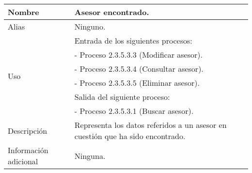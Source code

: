 \begin{center}
  \begin{tabular}{| l | p{9cm} |}
    \hline
    Nombre & \textbf{Asesor encontrado}.\\
    \hline
    Alias & Ninguno.\\
    \hline
    \multirow{6}{*}{Uso} & Entrada de los siguientes procesos:\\
                         & - Proceso 2.3.5.3.3 (Modificar asesor).\\
                         & - Proceso 2.3.5.3.4 (Consultar asesor).\\
                         & - Proceso 2.3.5.3.5 (Eliminar asesor).\\
                         & Salida del siguiente proceso:\\
                         & - Proceso 2.3.5.3.1 (Buscar asesor).\\
    \hline
    Descripción & Representa los datos referidos a un asesor
                  en cuestión que ha sido encontrado.\\
    \hline
    Información adicional & Ninguna.\\
    \hline
  \end{tabular}
\end{center}
